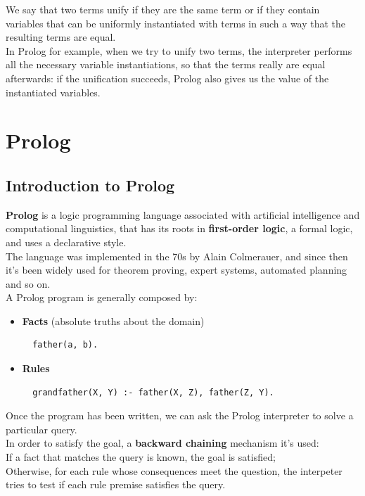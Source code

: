 \documentclass{article}
\begin{document}
We say that two terms unify if they are the same term or if they contain variables that can be uniformly instantiated with terms in such a way that the resulting terms are equal.\\

In Prolog for example, when we try to unify two terms, the interpreter performs all the necessary variable instantiations, so that the terms really are equal afterwards: if the unification succeeds, Prolog also gives us the value of the instantiated variables.\\

\pagebreak

\section{Prolog}
\subsection{Introduction to Prolog}
\textbf{Prolog} is a logic programming language associated with artificial intelligence and computational linguistics, that has its roots in \textbf{first-order logic}, a formal logic, and uses a declarative style.\\

The language was implemented in the 70s by Alain Colmerauer, and since then it's been widely used for theorem proving, expert systems, automated planning and so on.\\

A Prolog program is generally composed by:\\
\begin{itemize}
  \item \textbf{Facts} (absolute truths about the domain)
  \begin{verbatim}
  father(a, b).
  \end{verbatim}
  \item \textbf{Rules}
  \begin{verbatim}
  grandfather(X, Y) :- father(X, Z), father(Z, Y).
  \end{verbatim}
\end{itemize}

Once the program has been written, we can ask the Prolog interpreter to solve a particular query.\\

In order to satisfy the goal, a \textbf{backward chaining} mechanism it's used:\\
If a fact that matches the query is known, the goal is satisfied;\\
Otherwise, for each rule whose consequences meet the question, the interpeter tries to test if each rule premise satisfies the query.\\
\end{document}
